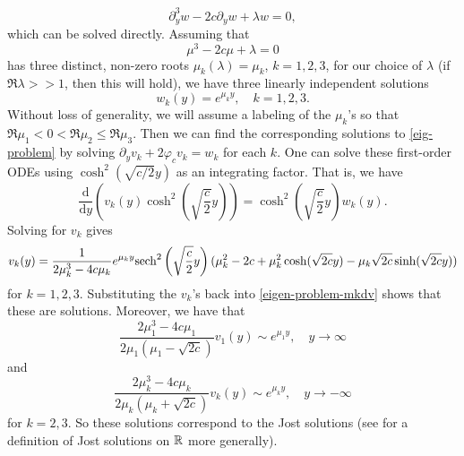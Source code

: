 \begin{equation*} 
	\partial_y^3 w - 2c \partial_y w + \lambda w = 0,
\end{equation*} 
which can be solved directly. Assuming that 
\begin{equation*} 
	\mu^3 - 2 c \mu + \lambda = 0
\end{equation*} 
has three distinct, non-zero roots \(\mu_k(\lambda) = \mu_k\), \(k =1,2,3\),  for our choice of \(\lambda\) (if \(\Re \lambda >> 1\), then this will hold), we have three linearly independent solutions 
\begin{equation*} 
	w_k(y)  = e^{\mu_k y}, \quad k =1,2,3.
\end{equation*} 
Without loss of generality, we will assume a labeling of the \(\mu_k\)'s so that \(\Re \mu_1 < 0 < \Re \mu_2 \leq \Re \mu_3\). Then we can find the corresponding solutions to \cref{eig-problem} by solving \(\partial_y v_k + 2 \varphi_c v_k = w_k\) for each \(k\). One can solve these first-order ODEs using \(\cosh^2(\sqrt{c/2} y)\) as an integrating factor. That is, we have
\begin{equation*} 
	\frac{\mathrm{d}}{\mathrm d y}\left( v_k(y) \cosh^2\left( \sqrt{\frac c 2} y\right) \right) =  \cosh^2\left( \sqrt{\frac c 2} y\right) w_k(y).
\end{equation*} 
Solving for \(v_k\) gives
\begin{equation*} 
	v_k(y) = \frac{1}{2 \mu_k^3 - 4c\mu_k} e^{\mu_k y} \mathrm{sech}^2\left( \sqrt{\frac c 2} y\right) (\mu_k^2 -2c + \mu_k^2 \cosh(\sqrt{2c} y) - \mu_k \sqrt{2c} \sinh(\sqrt{2c} y))
\end{equation*} 
for \(k=1,2,3\). Substituting the \(v_k\)'s back into \cref{eigen-problem-mkdv} shows that these are solutions. Moreover, we have that
\begin{equation}\label{yplus}
	\frac{2\mu_1^3 - 4c\mu_1}{2\mu_1(\mu_1 - \sqrt{2c})} v_1(y) \sim e^{\mu_1 y}, \quad y\to\infty
\end{equation}
and
\begin{equation*} 
	\frac{2\mu_k^3 - 4c\mu_k}{2\mu_k(\mu_k + \sqrt{2c})} v_k(y) \sim e^{\mu_k y}, \quad y\to-\infty
\end{equation*} 
for \(k = 2,3\). So these solutions correspond to the Jost solutions (see \cite[]{kapitula2013spectral} for a definition of Jost solutions on \(\mathbb{R}\) more generally).

